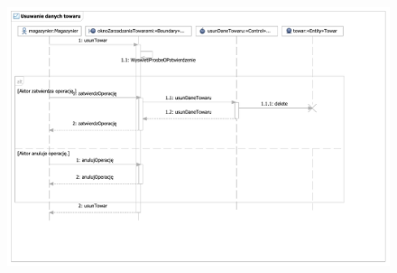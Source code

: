 \begin{figure}[H]
  \centering
  \includegraphics[angle=\seqangle, scale=\seqscale]{../img/usecase/pu21seq.pdf}
  \caption{}
\end{figure}
\newpage

